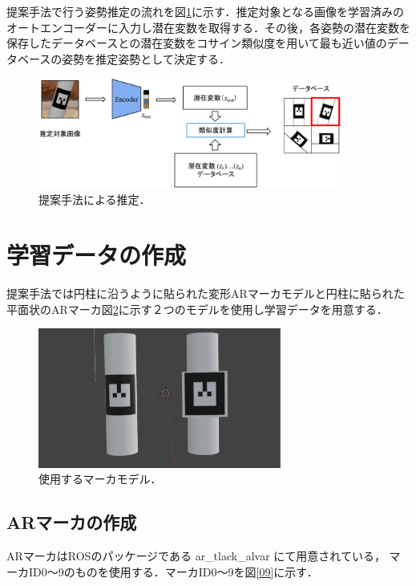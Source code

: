 提案手法で行う姿勢推定の流れを図\ref{suitei}に示す．推定対象となる画像を学習済みのオートエンコーダーに入力し潜在変数を取得する．その後，各姿勢の潜在変数を保存したデータベースとの潜在変数をコサイン類似度を用いて最も近い値のデータベースの姿勢を推定姿勢として決定する．

      \begin{figure}[htbp]
      \begin{center}
      \includegraphics[width=100mm]{figure/eps/提案手法の流れ.eps}
      \caption{提案手法による推定．}
      \label{suitei}
      \end{center}
      \end{figure}

\section{学習データの作成}

提案手法では円柱に沿うように貼られた変形ARマーカモデルと円柱に貼られた平面状のARマーカ図\ref{gazebo2}に示す２つのモデルを使用し学習データを用意する．

      \begin{figure}[htbp]
      \begin{center}
      \includegraphics[width=80mm]{figure/eps/二つのモデル.eps}
      \caption{使用するマーカモデル．}
      \label{gazebo2}
      \end{center}
      \end{figure}

\subsection{ARマーカの作成}
ARマーカはROSのパッケージである
ar\_tlack\_alvar
にて用意されている，
マーカID0～9のものを使用する．マーカID0～9を図\ref{09}に示す．

